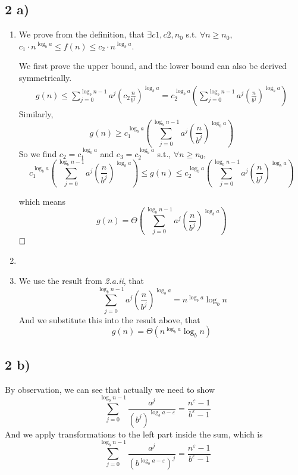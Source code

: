 \documentclass[A4paper]{article}
\newcommand{\qedhere}{$\hfill\ensuremath{\square}$}
\begin{document}
\subsection*{2 a)}
\begin{enumerate}

\item 
We prove from the definition, that $\exists c1, c2, n_0$ s.t. $\forall n \geq n_0$, $ c_1 \cdot n^{\log_ba} \leq f(n) \leq c_2 \cdot n^{\log_ba }$.
\par We first prove the upper bound, and the lower bound can also be derived symmetrically.
\[
	\begin{aligned}
	g(n) \leq \sum_{j=0}^{\log_bn-1} a^j (c_2\frac{n}{b^j})^{\log_ba} = c_2^{\log_ba} \left(\sum_{j=0}^{\log_bn-1} a^j (\frac{n}{b^j})^{\log_ba}\right)
	\end{aligned}
\]
Similarly, 
\[
	g(n) \geq c_1^{\log_ba} \left(\sum_{j=0}^{\log_bn-1} a^j (\frac{n}{b^j})^{\log_ba}\right)
\]
So we find $c_2 = c_1^{\log_ba}$ and $c_3 = c_2^{\log_ba}$ s.t., $\forall n \geq n_0$, $$c_1^{\log_ba} \left(\sum_{j=0}^{\log_bn-1} a^j (\frac{n}{b^j})^{\log_ba}\right) \leq g(n) \leq c_2^{\log_ba} \left(\sum_{j=0}^{\log_bn-1} a^j (\frac{n}{b^j})^{\log_ba}\right)$$

which means 
\[
	g(n) = \Theta(\sum_{j=0}^{\log_bn-1} a^j (\frac{n}{b^j})^{\log_ba})
\]
\qedhere

\item 
\item 
We use the result from \textit{2.a.ii}, that \[
	\sum_{j=0}^{\log_bn-1} a^j (\frac{n}{b^j})^{\log_ba} = n^{\log_ba} \log_bn
\]
And we substitute this into the result above, that 
\[
	g(n) = \Theta(n^{\log_ba} \log_bn)
\]
\end{enumerate}	
\newpage
\subsection*{2 b)}
By observation, we can see that actually we need to show
\[
	\sum_{j=0}^{\log_bn-1} \frac{a^j}{(b^j)^{\log_b a- \varepsilon}} = \frac{n^\varepsilon -1}{b^\varepsilon -1}
\]	
And we apply transformations to the left part inside the sum, which is 
\[
	\sum_{j=0}^{\log_bn-1} \frac{a^j}{(b^{\log_b a- \varepsilon})^j} = \frac{n^\varepsilon -1}{b^\varepsilon -1}
\]
\end{document}

